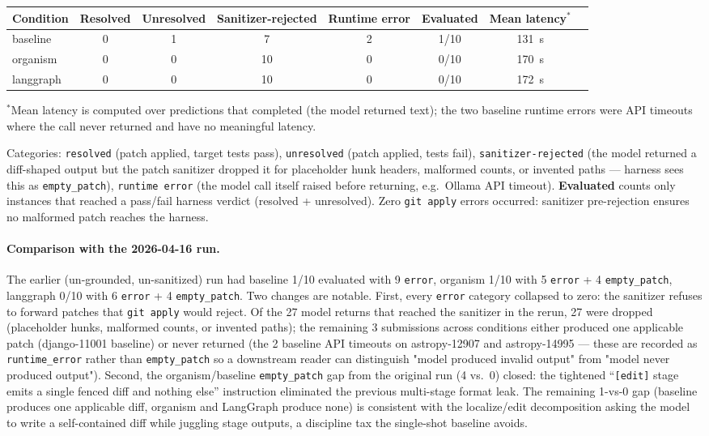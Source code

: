 \begin{center}
\small
\begin{tabular}{@{}lccccccc@{}}
\toprule
\textbf{Condition} & \textbf{Resolved} & \textbf{Unresolved} & \textbf{Sanitizer-rejected} & \textbf{Runtime error} & \textbf{Evaluated} & \textbf{Mean latency$^*$} \\
\midrule
baseline    & 0 & 1 & 7  & 2 & 1/10 & 131~s \\
organism    & 0 & 0 & 10 & 0 & 0/10 & 170~s \\
langgraph   & 0 & 0 & 10 & 0 & 0/10 & 172~s \\
\bottomrule
\end{tabular}
\end{center}
\noindent$^*$Mean latency is computed over predictions that completed (the model returned text); the two baseline runtime errors were API timeouts where the call never returned and have no meaningful latency.

Categories: \texttt{resolved} (patch applied, target tests pass), \texttt{unresolved} (patch applied, tests fail), \texttt{sanitizer-rejected} (the model returned a diff-shaped output but the patch sanitizer dropped it for placeholder hunk headers, malformed counts, or invented paths --- harness sees this as \texttt{empty\_patch}), \texttt{runtime error} (the model call itself raised before returning, e.g.\ Ollama API timeout). \textbf{Evaluated} counts only instances that reached a pass/fail harness verdict (resolved + unresolved). Zero \texttt{git apply} errors occurred: sanitizer pre-rejection ensures no malformed patch reaches the harness.

\paragraph{Comparison with the 2026-04-16 run.} The earlier (un-grounded, un-sanitized) run had baseline 1/10 evaluated with 9 \texttt{error}, organism 1/10 with 5 \texttt{error} + 4 \texttt{empty\_patch}, langgraph 0/10 with 6 \texttt{error} + 4 \texttt{empty\_patch}. Two changes are notable. First, every \texttt{error} category collapsed to zero: the sanitizer refuses to forward patches that \texttt{git apply} would reject. Of the 27 model returns that reached the sanitizer in the rerun, 27 were dropped (placeholder hunks, malformed counts, or invented paths); the remaining 3 submissions across conditions either produced one applicable patch (django-11001 baseline) or never returned (the 2 baseline API timeouts on astropy-12907 and astropy-14995 --- these are recorded as \texttt{runtime\_error} rather than \texttt{empty\_patch} so a downstream reader can distinguish "model produced invalid output" from "model never produced output"). Second, the organism/baseline \texttt{empty\_patch} gap from the original run (4 vs.\ 0) closed: the tightened ``\texttt{[edit]} stage emits a single fenced diff and nothing else'' instruction eliminated the previous multi-stage format leak. The remaining 1-vs-0 gap (baseline produces one applicable diff, organism and LangGraph produce none) is consistent with the localize/edit decomposition asking the model to write a self-contained diff while juggling stage outputs, a discipline tax the single-shot baseline avoids.

